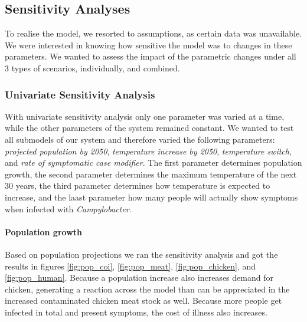 \subsection{Sensitivity Analyses}
To realise the model, we resorted to assumptions, as certain data was unavailable. We were interested in knowing how sensitive the model was to changes in these parameters. We wanted to assess the impact of the parametric changes under all 3 types of scenarios, individually, and combined.

\subsubsection{Univariate Sensitivity Analysis}
With univariate sensitivity analysis only one parameter was varied at a time, while the other parameters of the system remained constant. We wanted to test all submodels of our system and therefore varied the following parameters: \textit{projected population by 2050}, \textit{temperature increase by 2050}, \textit{temperature switch},  and \textit{rate of symptomatic case modifier}. The first parameter determines population growth, the second parameter determines the maximum temperature of the next 30 years, the third parameter determines how temperature is expected to increase, and the laast parameter how many people will actually show symptoms when infected with \textit{Campylobacter}.

\paragraph{Population growth}
Based on population projections \parencite{nidi_nidi_2020} we ran the sensitivity analysis and got the results in figures \ref{fig:pop_coi}, \ref{fig:pop_meat}, \ref{fig:pop_chicken}, and \ref{fig:pop_human}. Because a population increase also increases demand for chicken, generating a reaction across the model than can be appreciated in the increased contaminated chicken meat stock as well. Because more people get infected in total and present symptoms, the cost of illness also increases.

